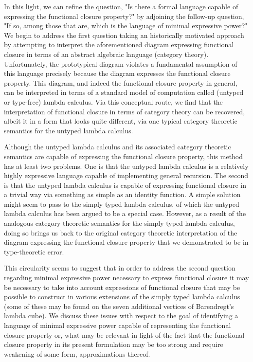 \documentclass[10pt]{article}
\begin{document}
In this light, we can refine the question, "Is there a formal language capable of expressing the functional closure property?" by adjoining the follow-up question, "If so, among those that are, which is the language of minimal expressive power?" We begin to address the first question taking an historically motivated approach  by attempting to interpret the aforementioned diagram expressing functional closure in terms of an abstract algebraic language (category theory). Unfortunately, the prototypical diagram violates a fundamental assumption of this language precisely because the diagram expresses the functional closure property. This diagram, and indeed the functional closure property in general, can be interpreted in terms of a standard model of computation called (untyped or type-free) lambda calculus. Via this conceptual route, we find that the interpretation of functional closure in terms of category theory can be recovered, albeit it in a form that looks quite different, via one typical category theoretic semantics for the untyped lambda calculus.

Although the untyped lambda calculus and its associated category theoretic semantics are capable of expressing the functional closure property, this method has at least two problems. One is that the untyped lambda calculus is a relatively highly expressive language capable of implementing general recursion. The second is that the untyped lambda calculus is capable of expressing functional closure in a trivial way via something as simple as an identity function. A simple solution might seem to pass to the simply typed lambda calculus, of which the untyped lambda calculus has been argued to be a special case. However, as a result of the analogous category theoretic semantics for the simply typed lambda calculus, doing so brings us back to the original category theoretic interpretation of the diagram expressing the functional closure property that we demonstrated to be in type-theoretic error.

This circularity seems to suggest that in order to address the second question regarding minimal expressive power necessary to express functional closure it may be necessary to take into account expressions of functional closure that may be possible to construct in various extensions of the simply typed lambda calculus (some of these may be found on the seven additional vertices of Barendregt's lambda cube). We discuss these issues with respect to the goal of identifying a language of minimal expressive power capable of representing the functional closure property or, what may be relevant in light of the fact that the functional closure property in its present formulation may be too strong and require weakening of some form, approximations thereof.
\end{document}
